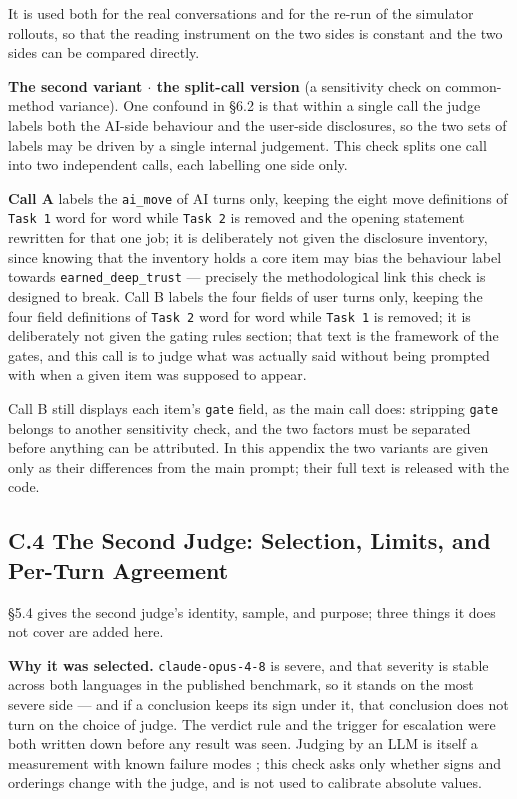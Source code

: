 \documentclass[letterpaper]{article}
\begin{document}
It is used both for the real conversations and for the re-run of the simulator rollouts, so that the reading instrument on the two sides is constant and the two sides can be compared directly.

\textbf{The second variant $\cdot$ the split-call version} (a sensitivity check on common-method variance). One confound in \S{}6.2 is that within a single call the judge labels both the AI-side behaviour and the user-side disclosures, so the two sets of labels may be driven by a single internal judgement. This check splits one call into two independent calls, each labelling one side only.

\textbf{Call A} labels the \texttt{ai\_move} of AI turns only, keeping the eight move definitions of \texttt{Task 1} word for word while \texttt{Task 2} is removed and the opening statement rewritten for that one job; it is deliberately not given the disclosure inventory, since knowing that the inventory holds a core item may bias the behaviour label towards \texttt{earned\_deep\_trust} --- precisely the methodological link this check is designed to break. Call B labels the four fields of user turns only, keeping the four field definitions of \texttt{Task 2} word for word while \texttt{Task 1} is removed; it is deliberately not given the gating rules section; that text is the framework of the gates, and this call is to judge what was actually said without being prompted with when a given item was supposed to appear.

Call B still displays each item's \texttt{gate} field, as the main call does: stripping \texttt{gate} belongs to another sensitivity check, and the two factors must be separated before anything can be attributed. In this appendix the two variants are given only as their differences from the main prompt; their full text is released with the code.


\subsection*{C.4 The Second Judge: Selection, Limits, and Per-Turn Agreement}

\S{}5.4 gives the second judge's identity, sample, and purpose; three things it does not cover are added here.

\textbf{Why it was selected.} \texttt{claude-opus-4-8} is severe, and that severity is stable across both languages in the published benchmark, so it stands on the most severe side --- and if a conclusion keeps its sign under it, that conclusion does not turn on the choice of judge. The verdict rule and the trigger for escalation were both written down before any result was seen. Judging by an LLM is itself a measurement with known failure modes \citep{zheng2023judging}; this check asks only whether signs and orderings change with the judge, and is not used to calibrate absolute values.
\end{document}
